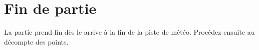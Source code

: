 \section*{Fin de partie}

La partie prend fin dès le \compteurManche arrive à la fin de la piste de météo. Procédez ensuite au décompte des points.

